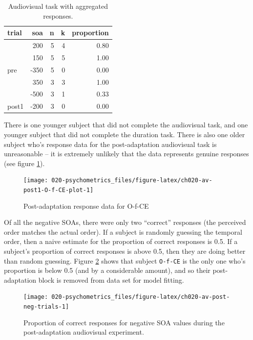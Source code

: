 \documentclass[11pt, oneside, openany]{scrbook}
\begin{document}
\begin{table}[!h]

\caption{\label{tab:ch020-av-bin-sample}Audiovisual task with aggregated responses.}
\centering
\begin{tabular}[t]{lrrrr}
\toprule
trial & soa & n & k & proportion\\
\midrule
 & 200 & 5 & 4 & 0.80\\
\cmidrule{2-5}
 & 150 & 5 & 5 & 1.00\\
\cmidrule{2-5}
\multirow[t]{-3}{*}{\raggedright\arraybackslash pre} & -350 & 5 & 0 & 0.00\\
\cmidrule{1-5}
 & 350 & 3 & 3 & 1.00\\
\cmidrule{2-5}
 & -500 & 3 & 1 & 0.33\\
\cmidrule{2-5}
\multirow[t]{-3}{*}{\raggedright\arraybackslash post1} & -200 & 3 & 0 & 0.00\\
\bottomrule
\end{tabular}
\end{table}

There is one younger subject that did not complete the audiovisual task, and one younger subject that did not complete the duration task. There is also one older subject who's response data for the post-adaptation audiovisual task is unreasonable -- it is extremely unlikely that the data represents genuine responses (see figure \ref{fig:ch020-av-post1-O-f-CE-plot}).

\begin{figure}

{\centering \texttt{[image: 020-psychometrics\_files/figure-latex/ch020-av-post1-O-f-CE-plot-1]} 

}

\caption{Post-adaptation response data for O-f-CE}\label{fig:ch020-av-post1-O-f-CE-plot}
\end{figure}

Of all the negative SOAs, there were only two ``correct'' responses (the perceived order matches the actual order). If a subject is randomly guessing the temporal order, then a naive estimate for the proportion of correct responses is 0.5. If a subject's proportion of correct responses is above 0.5, then they are doing better than random guessing. Figure \ref{fig:ch020-av-post-neg-trials} shows that subject \texttt{O-f-CE} is the only one who's proportion is below 0.5 (and by a considerable amount), and so their post-adaptation block is removed from data set for model fitting.

\begin{figure}

{\centering \texttt{[image: 020-psychometrics\_files/figure-latex/ch020-av-post-neg-trials-1]} 

}

\caption{Proportion of correct responses for negative SOA values during the post-adaptation audiovisual experiment.}\label{fig:ch020-av-post-neg-trials}
\end{figure}
\end{document}
